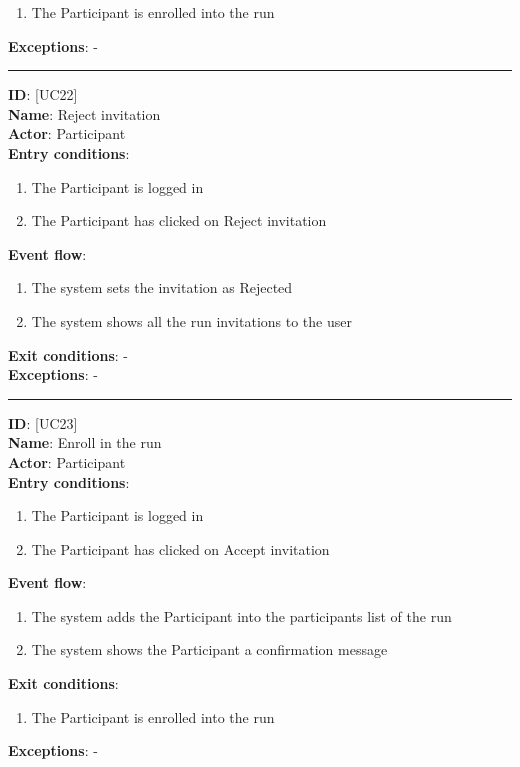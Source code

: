 \documentclass[12pt]{article}
\newcommand\usecase[1]{ [UC#1] }
\begin{document}
\begin{itemize}
\begin{enumerate}
    			\item{The Participant is enrolled into the run}
  		\end{enumerate}
  	\textbf{Exceptions}: - \\
  	\rule{\linewidth}{0.4pt}
  	\textbf{ID}: \usecase{22} \\
  	\textbf{Name}: Reject invitation \\
    \textbf{Actor}: Participant \\
    \textbf{Entry conditions}: 
    		\begin{enumerate}
    			\item{The Participant is logged in}
    			\item{The Participant has clicked on Reject invitation}
    		\end{enumerate}
  	\textbf{Event flow}:
  		\begin{enumerate}
    			\item{The system sets the invitation as Rejected}
    			\item{The system shows all the run invitations to the user}
  		\end{enumerate}
  	\textbf{Exit conditions}: - \\
  	\textbf{Exceptions}: - \\
  	\rule{\linewidth}{0.4pt}
  	\textbf{ID}: \usecase{23} \\
  	\textbf{Name}: Enroll in the run \\
    \textbf{Actor}: Participant \\
    \textbf{Entry conditions}: 
    		\begin{enumerate}
    			\item{The Participant is logged in}
    			\item{The Participant has clicked on Accept invitation}
    		\end{enumerate}
  	\textbf{Event flow}:
  		\begin{enumerate}
    			\item{The system adds the Participant into the participants list of the run}
    			\item{The system shows the Participant a confirmation message}
  		\end{enumerate}
  	\textbf{Exit conditions}:
  		\begin{enumerate}
    			\item{The Participant is enrolled into the run}
  		\end{enumerate}
  	\textbf{Exceptions}: - \\

\end{itemize}
\end{document}
